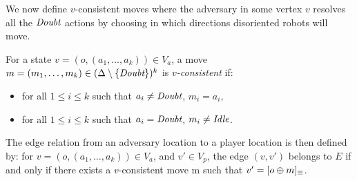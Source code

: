 We now define $v$-consistent moves where the adversary in some vertex $v$ resolves 
all the $\textit{Doubt}$ actions by choosing in which directions disoriented robots will move.
\begin{definition}\label{def:vCo}
For a state $v=(o, (a_1, \dots, a_k))\in V_a$, a move $m = (m_1, \dots, m_k)\in(\Delta \setminus \{\textit{Doubt}\})^k$
 is \emph{$v$-consistent} if:  
\begin{itemize}
\item for all $1\leq i\leq k$ such that $a_i\neq\textit{Doubt}$, $m_i=a_i$, 
\item for all $1\leq i\leq k$ such that $a_i=\textit{Doubt}$, $m_i\neq\textit{Idle}$.
\end{itemize}
\end{definition}


The edge relation from an adversary location 
to a player location is then defined by:  for $v=(o, (a_1, \dots, a_k))\in V_a$, and $v' \in V_p$, 
the edge $(v, v')$ belongs to $E$ if and only if there exists a $v$-consistent 
move m such that $v'=[o\oplus m]_{\equiv}$.

